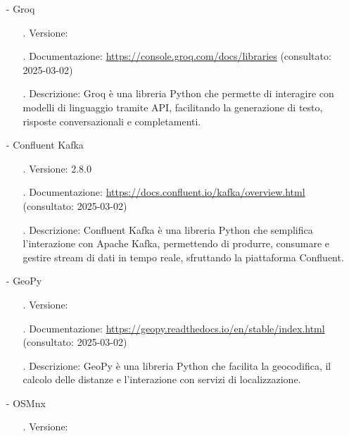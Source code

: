 \documentclass[10pt]{article}
\begin{document}
\begin{justify}
\begin{itemize}
\begin{itemize}
                        \end{itemize}
                    \item[-] Groq
                        \begin{itemize}
                            \item[.] Versione:
                            \item[.] Documentazione: \url{https://console.groq.com/docs/libraries} (consultato: 2025-03-02)
                            \item[.] Descrizione: Groq è una libreria Python che permette di interagire con modelli di linguaggio tramite API, facilitando la 
                            generazione di testo, risposte conversazionali e completamenti.
                        \end{itemize}
                    \item[-] Confluent Kafka
                        \begin{itemize}
                            \item[.] Versione: 2.8.0
                            \item[.] Documentazione: \url{https://docs.confluent.io/kafka/overview.html} (consultato: 2025-03-02)
                            \item[.] Descrizione: Confluent Kafka è una libreria Python che semplifica l’interazione con Apache Kafka, permettendo di produrre, 
                            consumare e gestire stream di dati in tempo reale, sfruttando la piattaforma Confluent.
                        \end{itemize}
                    \item[-] GeoPy
                    \begin{itemize}
                        \item[.] Versione:
                        \item[.] Documentazione: \url{https://geopy.readthedocs.io/en/stable/index.html} (consultato: 2025-03-02)
                        \item[.] Descrizione: GeoPy è una libreria Python che facilita la geocodifica, il calcolo delle distanze e l'interazione con servizi di localizzazione.
                    \end{itemize}
                    \item[-] OSMnx
                        \begin{itemize}
                            \item[.] Versione:

\end{itemize}
\end{itemize}
\end{justify}
\end{document}
